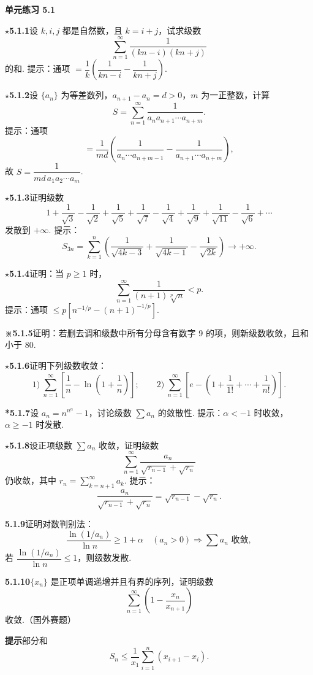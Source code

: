 \documentclass[UTF8,12pt,a4paper,fontset=fandol]{ctexart}
\begin{document}
\noindent\textbf{单元练习 5.1}

\noindent\textbf{$\star$5.1.1}\quad 设 $k,i,j$ 都是自然数，且 $k=i+j$，试求级数
\[
  \sum_{n=1}^{\infty}\frac1{(kn-i)(kn+j)}
\]
的和. 提示：通项 $=\dfrac1k\left(\dfrac1{kn-i}-\dfrac1{kn+j}\right)$.

\noindent\textbf{$\star$5.1.2}\quad 设 $\{a_n\}$ 为等差数列，$a_{n+1}-a_n=d>0$，$m$ 为一正整数，计算
\[
  S=\sum_{n=1}^{\infty}\frac1{a_n a_{n+1}\cdots a_{n+m}}.
\]
提示：通项
\[
  =\frac1{md}\left(\frac1{a_n\cdots a_{n+m-1}}-\frac1{a_{n+1}\cdots a_{n+m}}\right),
\]
故 $S=\dfrac1{md\,a_1a_2\cdots a_m}$.

\noindent\textbf{$\star$5.1.3}\quad 证明级数
\[
  1+\frac1{\sqrt3}-\frac1{\sqrt2}+\frac1{\sqrt5}+\frac1{\sqrt7}
  -\frac1{\sqrt4}+\frac1{\sqrt9}+\frac1{\sqrt{11}}-\frac1{\sqrt6}+\cdots
\]
发散到 $+\infty$. 提示：
\[
  S_{3n}=\sum_{k=1}^n\left(\frac1{\sqrt{4k-3}}+\frac1{\sqrt{4k-1}}-\frac1{\sqrt{2k}}\right)\to+\infty.
\]

\noindent\textbf{$\star$5.1.4}\quad 证明：当 $p\ge1$ 时，
\[
  \sum_{n=1}^{\infty}\frac1{(n+1)\sqrt[p]{n}}<p.
\]
提示：通项 $\le p[n^{-1/p}-(n+1)^{-1/p}]$.

\noindent\textbf{※5.1.5}\quad 证明：若删去调和级数中所有分母含有数字 9 的项，则新级数收敛，且和小于 80.

\noindent\textbf{$\star$5.1.6}\quad 证明下列级数收敛：
\[
  1)\ \sum_{n=1}^{\infty}\left[\frac1n-\ln\left(1+\frac1n\right)\right];
  \qquad
  2)\ \sum_{n=1}^{\infty}\left[e-\left(1+\frac1{1!}+\cdots+\frac1{n!}\right)\right].
\]

\noindent\textbf{*5.1.7}\quad 设 $a_n=n^{n^\alpha}-1$，讨论级数 $\displaystyle\sum a_n$ 的敛散性. 提示：$\alpha<-1$ 时收敛，$\alpha\ge-1$ 时发散.

\noindent\textbf{$\star$5.1.8}\quad 设正项级数 $\displaystyle\sum a_n$ 收敛，证明级数
\[
  \sum_{n=1}^{\infty}\frac{a_n}{\sqrt{r_{n-1}}+\sqrt{r_n}}
\]
仍收敛，其中 $r_n=\displaystyle\sum_{k=n+1}^{\infty}a_k$. 提示：
\[
  \frac{a_n}{\sqrt{r_{n-1}}+\sqrt{r_n}}=\sqrt{r_{n-1}}-\sqrt{r_n}.
\]

\noindent\textbf{5.1.9}\quad 证明对数判别法：
\[
  \frac{\ln(1/a_n)}{\ln n}\ge1+\alpha\quad(a_n>0)
  \Rightarrow \sum a_n\text{ 收敛},
\]
若 $\dfrac{\ln(1/a_n)}{\ln n}\le1$，则级数发散.

\noindent\textbf{5.1.10}\quad $\{x_n\}$ 是正项单调递增并且有界的序列，证明级数
\[
  \sum_{n=1}^{\infty}\left(1-\frac{x_n}{x_{n+1}}\right)
\]
收敛.（国外赛题）

\noindent\textbf{提示}\quad 部分和
\[
  S_n\le \frac1{x_1}\sum_{i=1}^n(x_{i+1}-x_i).
\]
\end{document}
